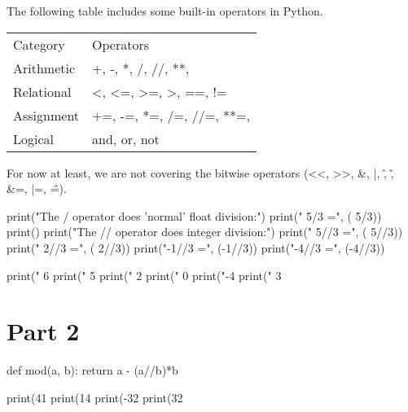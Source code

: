 \begin{flex}

\begin{gram}
The following table includes some built-in operators in Python.

\begin{tabular}{ll}
Category &	Operators
\\
Arithmetic &	+, -, *, /, //, **, %
\\
Relational &	\textless, \textless=, \textgreater=, \textgreater, ==, !=
\\
Assignment &	+=, -=, *=, /=, //=, **=, %
\\
Logical &	and, or, not
\end{tabular}
\end{gram}

\begin{note}
For now at least, we are not covering the bitwise operators (\textless\textless, \textgreater\textgreater, \&, |, \^, \~, \&=, |=, \^=).
\end{note}
\end{flex}

\begin{runpython}    
print("The / operator does 'normal' float division:")
print(" 5/3  =", ( 5/3))
print()
print("The // operator does integer division:")
print(" 5//3 =", ( 5//3))
print(" 2//3 =", ( 2//3))
print("-1//3 =", (-1//3))
print("-4//3 =", (-4//3))
\end{runpython}


\begin{runpython}
print(" 6%
print(" 5%
print(" 2%
print(" 0%
print("-4%
print(" 3%
\end{runpython}


\section{Part 2}

\begin{runpython}

def mod(a, b):
  return a - (a//b)*b

print(41%
print(14%
print(-32%
print(32%
\end{runpython}

